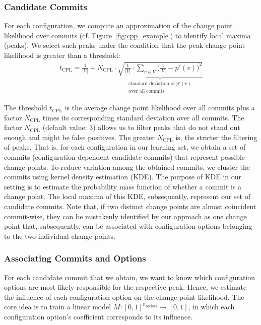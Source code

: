 \documentclass[sigconf, screen]{acmart}
\begin{document}
	\subsubsection{Candidate Commits}
	For each configuration, we compute an approximation of the change point likelihood over commits (cf. Figure~\ref{fig:cpp_example}) to identify local maxima (peaks). We select such peaks under the condition that the peak change point likelihood is greater than a threshold:
	\begin{equation}
	\begin{gathered}
	t_\text{CPL} = \frac{1}{\vert V\vert} + N_\text{CPL} \cdot \underbrace{\sqrt{\frac{1}{\vert V\vert} \cdot \sum_{v \in V} \Big(\frac{1}{\vert V\vert} - p'(v)\Big)^2}}_{\substack{\text{standard deviation of } p'(v) \\ \text{over all commits} }}
	\label{eq:t_cpl}
	\end{gathered}
	\end{equation}
	
	The threshold $t_\text{CPL}$ is the average change point likelihood over all commits plus a factor $N_\text{CPL}$ times its corresponding standard deviation over all commits. 
	The factor $N_\text{CPL}$ (default value: 3) allows us to filter peaks that do not stand out enough and might be false positives. The greater $N_\text{CPL}$ is, the stricter the filtering of peaks. That is, for each configuration in our learning set, we obtain a set of commits (configuration-dependent candidate commits) that represent possible change points.
	To reduce variation among the obtained commits, we cluster the commits using kernel density estimation (KDE). The purpose of KDE in our setting is to estimate the probability mass function of whether a commit is a change point. The local maxima of this KDE, subsequently, represent our set of candidate commits. Note that, if two distinct change points are almost coincident commit-wise, they can be mistakenly identified by our approach as one change point that, subsequently, can be associated with configuration options belonging to the two individual change points.
	
	\subsubsection{Associating Commits and Options}
	For each candidate commit that we obtain, we want to know which configuration options are most likely responsible for the respective peak. Hence, we estimate the influence  of each configuration option on the change point likelihood. The core idea is to train a linear model $M: [0,1]^{n_{\text{options}}} \rightarrow [0,1]$, in which each configuration option's coefficient corresponds to its influence. 
	
\end{document}
